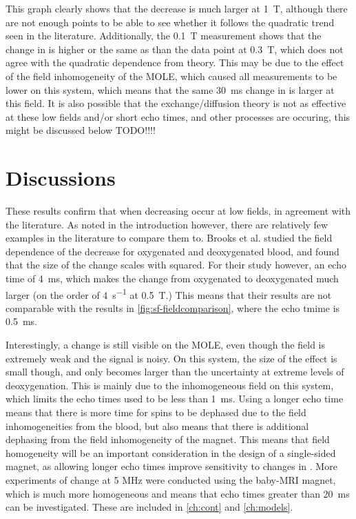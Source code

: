 This graph clearly shows that the \Ttwo decrease is much larger at \SI{1}{T}, although there are not enough points to be able to see whether it follows the quadratic trend seen in the literature.
Additionally, the \SI{0.1}{\tesla} measurement shows that the change in \Rtwo is higher or the same as than the data point at \SI{0.3}{T}, which does not agree with the quadratic dependence from theory.
This may be due to the effect of the field inhomogeneity of the MOLE, which caused all \Ttwo measurements to be lower on this system, which means that the same \SI{30}{ms} change in \Ttwo is larger at this field.
It is also possible that the exchange/diffusion theory is not as effective at these low fields and/or short echo times, and other processes are occuring, this might be discussed below TODO!!!!

\section{Discussions}

These results confirm that \Ttwo when decreasing \SOtwo occur at low fields, in agreement with the literature.
As noted in the introduction however, there are relatively few examples in the literature to compare them to.
Brooks et al. studied the field dependence of the \Ttwo decrease for oxygenated and deoxygenated blood, and found that the size of the \Rtwo change scales with \Bzero  squared\cite[Fig.1]{BrooksComparisont2relaxation1995}.
For their study however, an echo time of \SI{4}{ms}, which makes the \Rtwo change from oxygenated to deoxygenated much larger (on the order of \SI{4}{s^{-1}} at \SI{0.5}{T}.)
This means that their results are not comparable with the results in \autoref{fig:sf-fieldcomparison}, where the echo tmime is \SI{0.5}{ms}.

Interestingly, a change is still visible on the MOLE, even though the field is extremely weak and the signal is noisy.
On this system, the size of the effect is small though, and only becomes larger than the uncertainty at extreme levels of deoxygenation.
This is mainly due to the inhomogeneous field on this system, which limits the echo times used to be less than \SI{1}{ms}.
Using a longer echo time means that there is more time for spins to be dephased due to the field inhomogeneities from the blood, but also means that there is additional dephasing from the field inhomogeneity of the magnet.
This means that field homogeneity will be an important consideration in the design of a single-sided magnet, as allowing longer echo times improve sensitivity to changes in \SOtwo.
More experiments of \Ttwo change at 5 MHz were conducted using the baby-MRI magnet, which is much more homogeneous and means that echo times greater than \SI{20}{ms} can be investigated.
These are included in \autoref{ch:cont} and \autoref{ch:models}.

